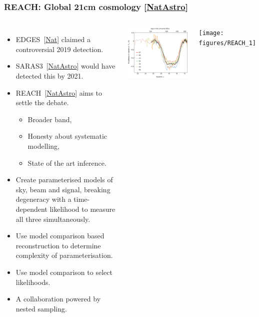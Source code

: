 \documentclass[aspectratio=169]{beamer}
\begin{document}
\begin{frame}
    \frametitle{REACH: Global 21cm cosmology [\href{https://www.nature.com/articles/s41550-022-01709-9}{NatAstro}]}
    \begin{columns}
        \begin{itemize}
            \item EDGES~[\href{https://www.nature.com/articles/nature25792}{Nat}] claimed a controversial 2019 detection.
            \item SARAS3~[\href{https://www.nature.com/articles/s41550-022-01610-5}{NatAstro}]  would have detected this by 2021.
            \item REACH~[\href{https://www.nature.com/articles/s41550-022-01709-9}{NatAstro}] aims to settle the debate.
                \begin{itemize}
                    \item Broader band,
                    \item Honesty about systematic modelling,
                    \item State of the art inference.
                \end{itemize}
            \item Create parameterised models of sky, beam and signal, breaking degeneracy with a time-dependent likelihood to measure all three simultaneously.
            \item Use model comparison based reconstruction to determine complexity of parameterisation.
            \item Use model comparison to select likelihoods.
            \item A collaboration powered by nested sampling.
        \end{itemize}

        \includegraphics[width=\textwidth]{figures/EDGES}
        \begin{center}
            \texttt{[image: figures/REACH\_1]}
        \end{center}
    \end{columns}

\end{frame}
\end{document}
